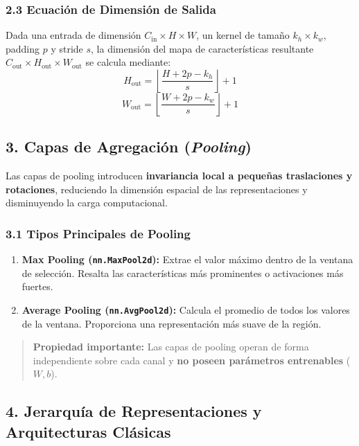 \subsubsection{2.3 Ecuación de Dimensión de Salida}

Dada una entrada de dimensión $C_{\text{in}} \times H \times W$, un kernel de tamaño $k_h \times k_w$, padding $p$ y stride $s$, la dimensión del mapa de características resultante $C_{\text{out}} \times H_{\text{out}} \times W_{\text{out}}$ se calcula mediante:
$$H_{\text{out}} = \left\lfloor \frac{H + 2p - k_h}{s} \right\rfloor + 1$$
$$W_{\text{out}} = \left\lfloor \frac{W + 2p - k_w}{s} \right\rfloor + 1$$

\subsection{3. Capas de Agregación (\emph{Pooling})}

Las capas de pooling introducen \textbf{invariancia local a pequeñas traslaciones y rotaciones}, reduciendo la dimensión espacial de las representaciones y disminuyendo la carga computacional.

\subsubsection{3.1 Tipos Principales de Pooling}

\begin{enumerate}
	\item \textbf{Max Pooling (\texttt{nn.MaxPool2d}):} Extrae el valor máximo dentro de la ventana de selección. Resalta las características más prominentes o activaciones más fuertes.
	\item \textbf{Average Pooling (\texttt{nn.AvgPool2d}):} Calcula el promedio de todos los valores de la ventana. Proporciona una representación más suave de la región.
\end{enumerate}

\begin{quote}
	\textbf{Propiedad importante:} Las capas de pooling operan de forma independiente sobre cada canal y \textbf{no poseen parámetros entrenables} ($W, b$).
\end{quote}

\subsection{4. Jerarquía de Representaciones y Arquitecturas Clásicas}

